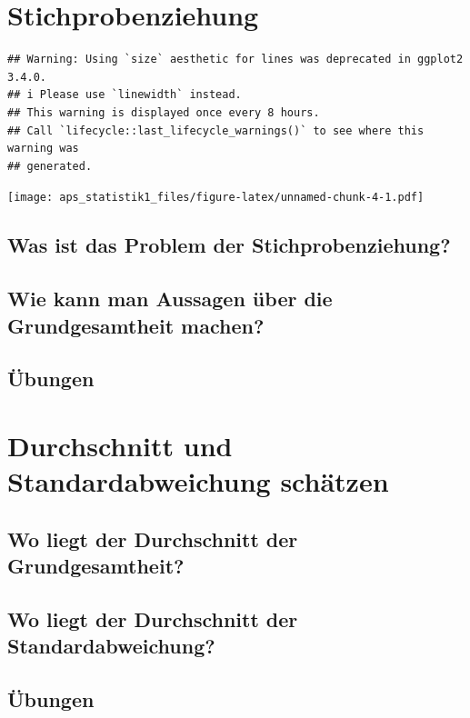 \documentclass[
]{book}
\theoremstyle{definition}
\theoremstyle{definition}
\theoremstyle{definition}
\theoremstyle{definition}
\theoremstyle{remark}
\begin{document}
\chapter{Stichprobenziehung}\label{stichprobenziehung}

\begin{verbatim}
## Warning: Using `size` aesthetic for lines was deprecated in ggplot2 3.4.0.
## i Please use `linewidth` instead.
## This warning is displayed once every 8 hours.
## Call `lifecycle::last_lifecycle_warnings()` to see where this warning was
## generated.
\end{verbatim}

\texttt{[image: aps\_statistik1\_files/figure-latex/unnamed-chunk-4-1.pdf]}

\section{Was ist das Problem der Stichprobenziehung?}\label{was-ist-das-problem-der-stichprobenziehung}

\section{Wie kann man Aussagen über die Grundgesamtheit machen?}\label{wie-kann-man-aussagen-uxfcber-die-grundgesamtheit-machen}

\section{Übungen}\label{uxfcbungen-1}

\chapter{Durchschnitt und Standardabweichung schätzen}\label{durchschnitt-und-standardabweichung-schuxe4tzen}

\section{Wo liegt der Durchschnitt der Grundgesamtheit?}\label{wo-liegt-der-durchschnitt-der-grundgesamtheit}

\section{Wo liegt der Durchschnitt der Standardabweichung?}\label{wo-liegt-der-durchschnitt-der-standardabweichung}

\section{Übungen}\label{uxfcbungen-2}
\end{document}
